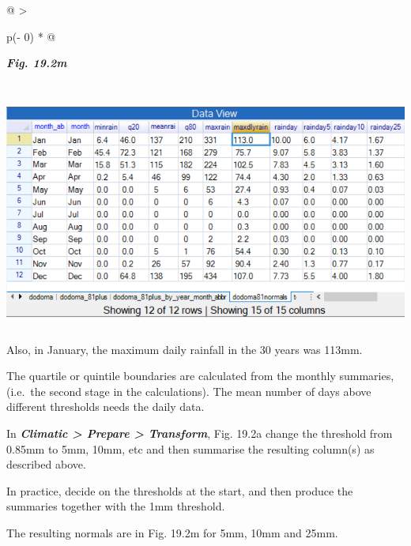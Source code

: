 \documentclass[
  letterpaper,
  DIV=11,
  numbers=noendperiod]{scrreprt}
\begin{document}
\begin{longtable}[]{@{}
  >{\raggedright\arraybackslash}p{(\columnwidth - 0\tabcolsep) * }@{}}
\toprule\noalign{}
\begin{minipage}[b]{\linewidth}\raggedright
\textbf{\emph{Fig. 19.2m}}
\end{minipage} \\
\midrule\noalign{}
\endhead
\bottomrule\noalign{}
\endlastfoot
\includegraphics[width=5.71349in,height=3.02829in]{figures/Fig19.2m.png} \\
\end{longtable}

Also, in January, the maximum daily rainfall in the 30 years was 113mm.

The quartile or quintile boundaries are calculated from the monthly
summaries, (i.e.~the second stage in the calculations). The mean number
of days above different thresholds needs the daily data.

In \textbf{\emph{Climatic \textgreater{} Prepare \textgreater{}
Transform}}, Fig. 19.2a change the threshold from 0.85mm to 5mm, 10mm,
etc and then summarise the resulting column(s) as described above.

In practice, decide on the thresholds at the start, and then produce the
summaries together with the 1mm threshold.

The resulting normals are in Fig. 19.2m for 5mm, 10mm and 25mm.
\end{document}
